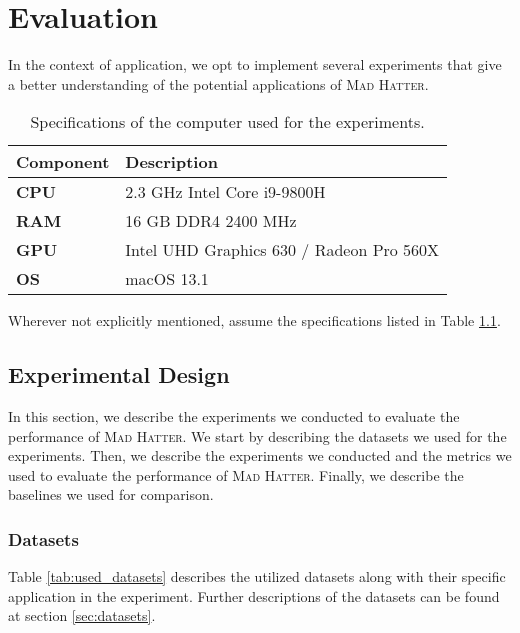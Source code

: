 \chapter{Evaluation}
\label{chap:evaluation}
In the context of application, we opt to implement several experiments that give a better understanding of the potential applications of \textsc{Mad Hatter}. 

\begin{table}[htbp]
    \centering
    \begin{tabular}{lp{}}
        \toprule
        \textbf{Component} & \textbf{Description} \\
        \midrule
        \textbf{CPU} & 2.3 GHz Intel Core i9-9800H \\
        \textbf{RAM} & 16 GB DDR4 2400 MHz \\
        \textbf{GPU} & Intel UHD Graphics 630 / Radeon Pro 560X  \\
        \textbf{OS} & macOS 13.1\\
        \bottomrule
    \end{tabular}
    \caption{Specifications of the computer used for the experiments.}
    \label{tab:specs}
    
    
\end{table}
Wherever not explicitly mentioned, assume the specifications listed in Table \ref{tab:specs}.

\section{Experimental Design}
\label{sec:experimental_design}
In this section, we describe the experiments we conducted to evaluate the performance of \textsc{Mad Hatter}. We start by describing the datasets we used for the experiments. Then, we describe the experiments we conducted and the metrics we used to evaluate the performance of \textsc{Mad Hatter}. Finally, we describe the baselines we used for comparison.

\subsection{Datasets}
\label{sec:datasets_expdesign}
Table \ref{tab:used_datasets} describes the utilized datasets along with their specific application in the experiment. Further descriptions of the datasets can be found at section \ref{sec:datasets}.

